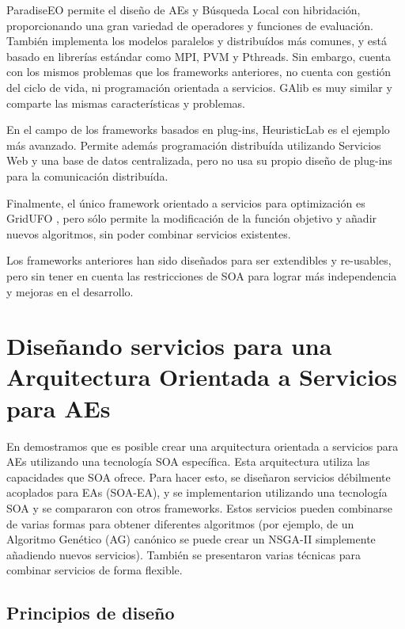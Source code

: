\documentclass[runningheads]{llncs}
\begin{document}
ParadiseEO \cite{PARADISEO} permite el diseño de AEs y Búsqueda Local con hibridación, proporcionando una gran variedad de operadores y funciones de evaluación. También implementa los modelos paralelos y distribuídos más comunes, y está basado en librerías estándar como MPI, PVM y Pthreads. Sin embargo, cuenta con los mismos problemas que los frameworks anteriores, no cuenta con gestión del ciclo de vida, ni programación orientada a servicios. GAlib \cite{GALIB} es muy similar y comparte las mismas características y problemas. 

En el campo de los frameworks basados en plug-ins, HeuristicLab \cite{HEURISTICLAB} es el ejemplo más avanzado. Permite además programación distribuída utilizando Servicios Web y una base de datos centralizada, pero no usa su propio diseño de plug-ins para la comunicación distribuída.

Finalmente, el único framework orientado a servicios para optimización es GridUFO \cite{GRIDUFO}, pero sólo permite la modificación de la función objetivo y añadir nuevos algoritmos, sin poder combinar servicios existentes.

Los frameworks anteriores han sido diseñados para ser extendibles y re-usables, pero sin tener en cuenta las restricciones de SOA para lograr más independencia y mejoras en el desarrollo.

\section{Diseñando servicios para una Arquitectura Orientada a Servicios para AEs}
\label{sec:design}

En \cite{OSGILIATH} demostramos que es posible crear una arquitectura orientada a servicios para AEs utilizando una tecnología SOA específica. Esta arquitectura utiliza las capacidades que SOA ofrece. Para hacer esto, se diseñaron servicios débilmente acoplados para EAs (SOA-EA), y se implementarion utilizando una tecnología SOA y se compararon con otros frameworks. Estos servicios pueden combinarse de varias formas para obtener diferentes algoritmos (por ejemplo, de un Algoritmo Genético (AG) canónico se puede crear un NSGA-II simplemente añadiendo nuevos servicios). También se presentaron varias técnicas para combinar servicios de forma flexible.


\subsection{Principios de diseño}
\end{document}
